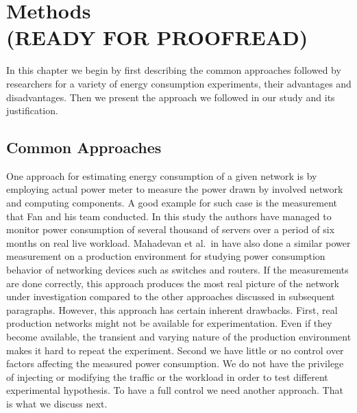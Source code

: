 \chapter{Methods\\(READY FOR PROOFREAD)}
\label{chapter:methods}
In this chapter we begin by first describing the common approaches followed by researchers for a variety of energy consumption experiments, their advantages and disadvantages. Then we present the approach we followed in our study and its justification.
\section{Common Approaches}
\label{section:commonappraoches}
One approach for estimating energy consumption of a given network is by employing actual power meter to measure the power drawn by involved network and computing components. A good example for such case is the measurement that Fan and his team conducted\cite{DBLP:conf/isca/FanWB07}. In this study the authors have managed to monitor power consumption of several thousand of servers over a period of six months on real live workload. Mahadevan et al.{\ }in \cite{DBLP:conf/networking/MahadevanSBR09} have also done a similar power measurement on a production environment for studying power consumption behavior of networking devices such as switches and routers. If the measurements are done correctly, this approach produces the most real picture of the network under investigation compared to the other approaches discussed in subsequent paragraphs. However, this approach has certain inherent drawbacks. First, real production networks might not be available for experimentation. Even if they become available, the transient and varying nature of the production environment makes it hard to repeat the experiment. Second we have little or no control over factors affecting the measured power consumption. We do not have the privilege of injecting or modifying the traffic or the workload in order to test different experimental hypothesis. To have a full control we need another approach. That is what we discuss next.

